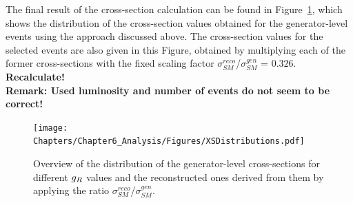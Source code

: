 The final result of the cross-section calculation can be found in Figure~\ref{fig::XSDistr}, which shows the distribution of the cross-section values obtained for the generator-level events using the approach discussed above. The cross-section values for the selected events are also given in this Figure, obtained by multiplying each of the former cross-sections with the fixed scaling factor $\sigma_{SM}^{reco}$/$\sigma_{SM}^{gen}$ = $0.326$. \textbf{Recalculate!}
\\
\textbf{Remark: Used luminosity and number of events do not seem to be correct!}
\begin{figure}[h!t]
 \centering
 \texttt{[image: Chapters/Chapter6\_Analysis/Figures/XSDistributions.pdf]}
 \caption{Overview of the distribution of the generator-level cross-sections for different $g_{R}$ values and the reconstructed ones derived from them by applying the ratio $\sigma_{SM}^{reco}$/$\sigma_{SM}^{gen}$.} \label{fig::XSDistr}
\end{figure}

